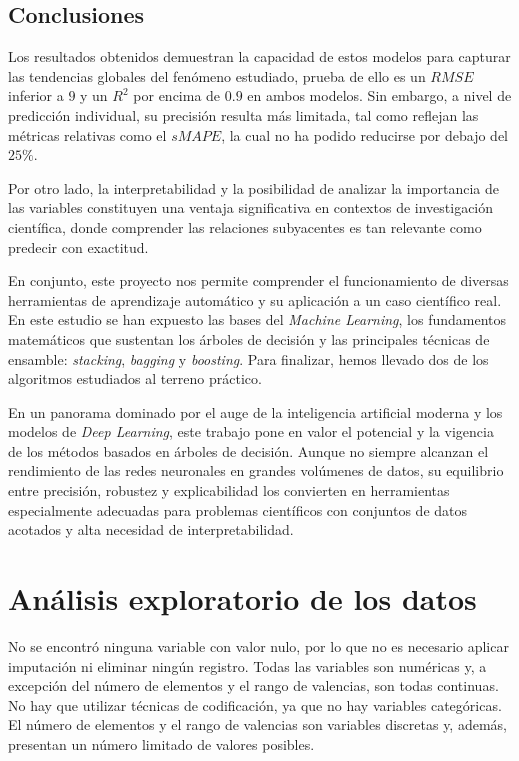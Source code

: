 \documentclass[titlepage, 11pt]{book}
\begin{document}
\section{Conclusiones}
Los resultados obtenidos demuestran la capacidad de estos modelos para capturar las tendencias globales del fenómeno estudiado, prueba de ello es un $RMSE$ inferior a $9$  y un $R^2$ por encima de $0.9$ en ambos modelos. Sin embargo, a nivel de predicción individual, su precisión resulta más limitada, tal como reflejan las métricas relativas como el $sMAPE$, la cual no ha podido reducirse por debajo del $25\%$.

Por otro lado, la interpretabilidad y la posibilidad de analizar la importancia de las variables constituyen una ventaja significativa en contextos de investigación científica, donde comprender las relaciones subyacentes es tan relevante como predecir con exactitud.

En conjunto, este proyecto nos permite comprender el funcionamiento de diversas herramientas de aprendizaje automático y su aplicación a un caso científico real. En este estudio se han expuesto las bases del \textit{Machine Learning}, los fundamentos matemáticos que sustentan los árboles de decisión y las principales técnicas de ensamble: \textit{stacking}, \textit{bagging} y \textit{boosting}. Para finalizar, hemos llevado dos de los algoritmos estudiados al terreno práctico.

En un panorama dominado por el auge de la inteligencia artificial moderna y los modelos de \textit{Deep Learning}, este trabajo pone en valor el potencial y la vigencia de los métodos basados en árboles de decisión. Aunque no siempre alcanzan el rendimiento de las redes neuronales en grandes volúmenes de datos, su equilibrio entre precisión, robustez y explicabilidad los convierten en herramientas especialmente adecuadas para problemas científicos con conjuntos de datos acotados y alta necesidad de interpretabilidad.


\printbibliography

\appendix
\chapter{Análisis exploratorio de los datos} \label{ap:EDA}
No se encontró ninguna variable con valor nulo, por lo que no es necesario aplicar imputación ni eliminar ningún registro. Todas las variables son numéricas y, a excepción del número de elementos y el rango de valencias, son todas continuas. No hay que utilizar técnicas de codificación, ya que no hay variables categóricas. El número de elementos y el rango de valencias son variables discretas y, además, presentan un número limitado de valores posibles.
\end{document}
